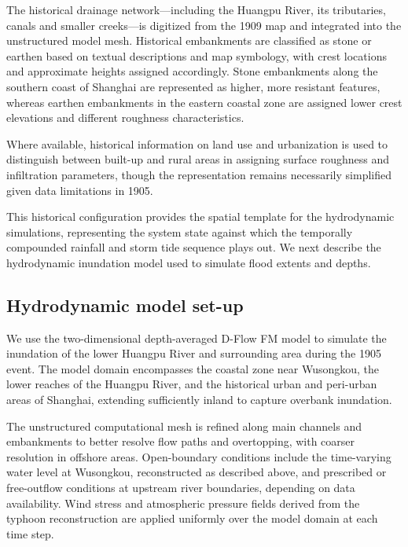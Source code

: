\documentclass[
]{article}
\begin{document}
The historical drainage network---including the Huangpu River, its
tributaries, canals and smaller creeks---is digitized from the 1909 map
and integrated into the unstructured model mesh. Historical embankments
are classified as stone or earthen based on textual descriptions and map
symbology, with crest locations and approximate heights assigned
accordingly. Stone embankments along the southern coast of Shanghai are
represented as higher, more resistant features, whereas earthen
embankments in the eastern coastal zone are assigned lower crest
elevations and different roughness characteristics.

Where available, historical information on land use and urbanization is
used to distinguish between built-up and rural areas in assigning
surface roughness and infiltration parameters, though the representation
remains necessarily simplified given data limitations in 1905.

This historical configuration provides the spatial template for the
hydrodynamic simulations, representing the system state against which
the temporally compounded rainfall and storm tide sequence plays out. We
next describe the hydrodynamic inundation model used to simulate flood
extents and depths.

\subsection{\texorpdfstring{\textbf{Hydrodynamic model
set-up}}{Hydrodynamic model set-up}}\label{hydrodynamic-model-set-up}

We use the two-dimensional depth-averaged D-Flow FM model to simulate
the inundation of the lower Huangpu River and surrounding area during
the 1905 event. The model domain encompasses the coastal zone near
Wusongkou, the lower reaches of the Huangpu River, and the historical
urban and peri-urban areas of Shanghai, extending sufficiently inland to
capture overbank inundation.

The unstructured computational mesh is refined along main channels and
embankments to better resolve flow paths and overtopping, with coarser
resolution in offshore areas. Open-boundary conditions include the
time-varying water level at Wusongkou, reconstructed as described above,
and prescribed or free-outflow conditions at upstream river boundaries,
depending on data availability. Wind stress and atmospheric pressure
fields derived from the typhoon reconstruction are applied uniformly
over the model domain at each time step.
\end{document}
